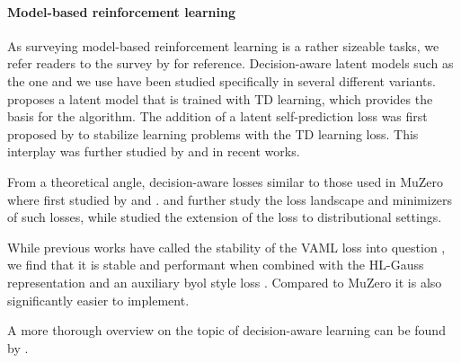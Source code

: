\paragraph{Model-based reinforcement learning} As surveying model-based reinforcement learning is a rather sizeable tasks, we refer readers to the survey by \textcite{moerland} for reference.
Decision-aware latent models such as the one \textcite{hansen2024tdmpc} and we use have been studied specifically in several different variants.
\textcite{silver2017predictron} proposes a latent model that is trained with TD learning, which provides the basis for the \textcite{schrittwieser2020mastering} algorithm.
The addition of a latent self-prediction loss was first proposed by \textcite{li2023efficient} to stabilize learning problems with the TD learning loss.
This interplay was further studied by \textcite{ni2024bridging} and \textcite{voelcker2024when} in recent works.

From a theoretical angle, decision-aware losses similar to those used in MuZero where first studied by \textcite{vaml} and \textcite{itervaml}.
\textcite{grimm2020value} and \textcite{grimm2021proper} further study the loss landscape and minimizers of such losses, while \textcite{kastner2023distributional} studied the extension of the loss to distributional settings.

While previous works have called the stability of the VAML loss into question \textcite{lovatto2020decision,voelcker2022value}, we find that it is stable and performant when combined with the HL-Gauss representation \textcite{farebrother2024stop} and an auxiliary \ac{byol} style loss \textcite{grill2020bootstrap,li2023efficient}.
Compared to MuZero it is also significantly easier to implement.

A more thorough overview on the topic of decision-aware learning can be found by \textcite{wei2024a}.


